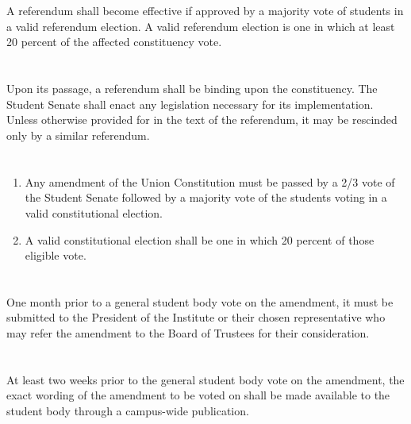\documentclass{uniondoc}
\begin{document}
\section{}

A referendum shall become effective if approved by a majority vote of students in a valid referendum election. A valid referendum election is one in which at least 20 percent of the affected constituency vote.

\section{}

Upon its passage, a referendum shall be binding upon the constituency. The Student Senate shall enact any legislation necessary for its implementation. Unless otherwise provided for in the text of the referendum, it may be rescinded only by a similar referendum.


\section{}

\begin{enumerate}
\item Any amendment of the Union Constitution must be passed by a 2/3 vote of the Student Senate followed by a majority vote of the students voting in a valid constitutional election.
\item A valid constitutional election shall be one in which 20 percent of those eligible vote.
\end{enumerate}

\section{}

One month prior to a general student body vote on the amendment, it must be submitted to the President of the Institute or their chosen representative who may refer the amendment to the Board of Trustees for their consideration.

\section{}

At least two weeks prior to the general student body vote on the amendment, the exact wording of the amendment to be voted on shall be made available to the student body through a campus-wide publication.
\end{document}
